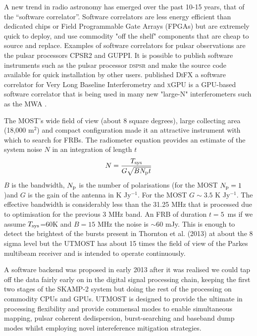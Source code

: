 A new trend in radio astronomy has emerged over the past 10-15 years, that of the ``software correlator''. Software correlators are less energy efficient than dedicated chips or Field Programmable Gate Arrays (FPGAs) but are extremely quick to deploy, and use commodity "off the shelf" components that are cheap to source and replace. Examples of software correlators for pulsar observations are the pulsar processors CPSR2 \citep{Bailes_2009} and GUPPI\citep{DuPlain_2008}. It is possible to publish software instruments such as the pulsar processor \textsc{dspsr} \citep{van_Straten_2011} and make the source code available for quick installation by other users. \citep{Deller_2007} published \textsc{DiFX} a software correlator for Very Long Baseline Interferometry and \textsc{xGPU} \citep{Clark_2012} is a GPU-based software correlator that is being used in many new "large-N" interferometers such as the MWA \citep{Tingay_2013}. 

The MOST's wide field of view (about 8 square degrees), large collecting area (18,000 m$^2$) and compact configuration made it an attractive instrument with which to search for FRBs. The radiometer equation provides an estimate of the system noise $N$ in an integration of length $t$ 
\begin{equation}
N={{T_{\rm sys}}\over{G\sqrt{BN_{\rm p}t}}}
\end{equation}
\noindent $B$ is the bandwidth, $N_{\rm p}$ is the number of polarisations (for the MOST $N_{\rm p}=1$)and $G$ is the gain of the antenna in K Jy$^{-1}$. For the MOST $G\sim 3.5$ K Jy$^{-1}$. The effective bandwidth is considerably less than the 31.25 MHz that is processed due to optimisation for the previous 3 MHz band. An FRB of duration $t=5$\, ms if we assume $T_{\rm sys}$=60K and $B=15 $ MHz the noise is $\sim$60 mJy. This is enough to detect the brightest of the bursts present in Thornton et al. (2013) at about the 8 sigma level but the UTMOST has about 15 times the field of view of the Parkes multibeam receiver and is intended to operate continuously.

A software backend was proposed in early 2013 after it was realised we could tap off the data fairly early on in the digital signal processing chain, keeping the first two stages of the SKAMP-2 system but doing the rest of the processing on commodity CPUs and GPUs. UTMOST is designed to provide the ultimate in processing flexibility and provide commensal modes to enable simultaneous mapping, pulsar coherent dedispersion, burst-searching and baseband dump modes whilst employing novel intereference mitigation strategies.

